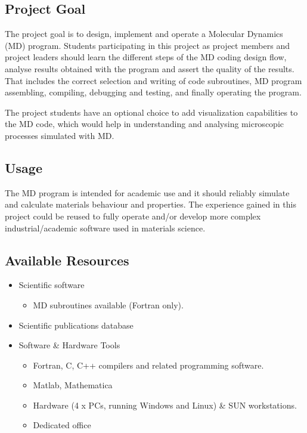 \documentclass[12pt,a4paper]{article}
\begin{document}
\subsection{Project Goal}
The project goal is to design, implement and operate a Molecular Dynamics (MD) program. Students participating in this project as project members and project leaders should learn the different steps of the MD coding design flow, analyse results obtained with the program and assert the quality of the results. That includes the correct selection and writing of code subroutines, MD program assembling, compiling, debugging and testing, and finally operating the program. 

The project students have an optional choice to add visualization capabilities to the MD code, which would help in understanding and analysing microscopic processes simulated with MD.

\subsection{Usage}
The MD program is intended for academic use and it should reliably simulate and calculate materials behaviour and properties. The experience gained in this project could be reused to fully operate and/or develop more complex industrial/academic software used in materials science.

\subsection{Available Resources}
\begin{itemize}
\item Scientific software
	\begin{itemize}
	\item MD subroutines available (Fortran only). 
	\end{itemize}
\item Scientific publications database
\item Software \& Hardware Tools
	\begin{itemize}
	\item Fortran, C, C++ compilers and related programming software. 
	\item Matlab, Mathematica
	\item Hardware (4 x PCs, running Windows and Linux) \& SUN workstations. 
	\item Dedicated office
	\end{itemize}
\end{itemize}
\end{document}
